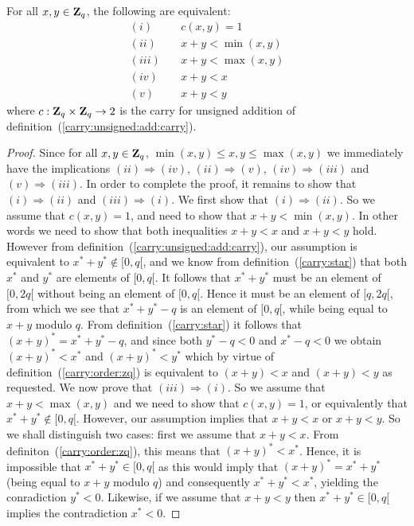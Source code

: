 \documentclass{article}
\newcommand{\zq}{\mbox{${\bf Z}_{q}$}}
\begin{document}
\begin{prop}\label{carry:unsigned:add:criterium}
  For all $x,y\in\zq$, the following are equivalent:
    \begin{eqnarray*}
      (i)&\ &c(x,y) = 1\\
      (ii)&\ & x + y < \min(x,y)\\
      (iii)&\ & x + y < \max(x,y)\\
      (iv)&\ & x + y < x\\
      (v) &\ & x + y < y
    \end{eqnarray*}
where $c:\zq\times\zq\rightarrow 2$ is the carry for unsigned addition of 
  definition~(\ref{carry:unsigned:add:carry}).
\end{prop}
\begin{proof}
  Since for all $x,y\in\zq$, $\min(x,y)\leq x, y\leq\max(x,y)$ we immediately 
  have the implications $(ii)\Rightarrow(iv)$, $(ii)\Rightarrow(v)$, 
  $(iv)\Rightarrow(iii)$ and $(v)\Rightarrow(iii)$. In order to complete
  the proof, it remains to show that $(i)\Rightarrow(ii)$ and 
  $(iii)\Rightarrow(i)$. We first show that $(i)\Rightarrow(ii)$. So 
  we assume that $c(x,y) = 1$, and need to show that $x+y<\min(x,y)$.
  In other words we need to show that both inequalities $x+y<x$ and 
  $x+y<y$ hold. However from definition~(\ref{carry:unsigned:add:carry}),
  our assumption is equivalent to $x^{*}+y^{*}\not\in[0,q[$, and we know
  from definition~(\ref{carry:star}) that both $x^{*}$ and $y^{*}$ are elements
  of $[0,q[$. It follows that $x^{*}+y^{*}$ must be an element of $[0,2q[$
  without being an element of $[0,q[$. Hence it must be an element of
  $[q,2q[$, from which we see that $x^{*}+y^{*}-q$ is an element of $[0,q[$,
  while being equal to $x+y$ modulo $q$. From definition~(\ref{carry:star})
  it follows that $(x+y)^{*}=x^{*}+y^{*}-q$, and since both $y^{*}-q <0$ and 
  $x^{*}-q<0$ we obtain $(x+y)^{*}<x^{*}$ and $(x+y)^{*}<y^{*}$ which by
  virtue of definition~(\ref{carry:order:zq}) is equivalent to $(x+y)<x$ and 
  $(x+y)<y$ as requested. We now prove that $(iii)\Rightarrow(i)$. So we
  assume that $x+y <\max(x,y)$ and we need to show that $c(x,y)=1$, or
  equivalently that $x^{*}+y^{*}\not\in[0,q[$. However, our assumption
  implies that $x+y<x$ or $x+y<y$. So we shall distinguish two cases:
  first we assume that $x+y<x$. From definiton~(\ref{carry:order:zq}), 
  this means that $(x+y)^{*}<x^{*}$. Hence, it is impossible that 
  $x^{*}+y^{*}\in[0,q[$ as this would imply that $(x+y)^{*}=x^{*}+y^{*}$ 
  (being equal to $x+y$ modulo $q$) and consequently $x^{*}+y^{*}<x^{*}$, 
  yielding the conradiction $y^{*}<0$. Likewise, if we assume that $x+y<y$ 
  then $x^{*}+y^{*}\in[0,q[$ implies the contradiction $x^{*}<0$.
\end{proof}
\end{document}
